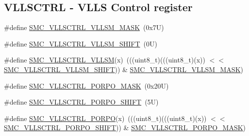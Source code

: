 \subsection*{V\+L\+L\+S\+C\+T\+RL -\/ V\+L\+LS Control register}
\begin{DoxyCompactItemize}
\item 
\#define \mbox{\hyperlink{group___s_m_c___register___masks_ga4f4e91c4841316ab1eae1a74c0091ff4}{S\+M\+C\+\_\+\+V\+L\+L\+S\+C\+T\+R\+L\+\_\+\+V\+L\+L\+S\+M\+\_\+\+M\+A\+SK}}~(0x7\+U)
\item 
\#define \mbox{\hyperlink{group___s_m_c___register___masks_ga67af6c7ed0835ed408cf511e8b9c9b13}{S\+M\+C\+\_\+\+V\+L\+L\+S\+C\+T\+R\+L\+\_\+\+V\+L\+L\+S\+M\+\_\+\+S\+H\+I\+FT}}~(0\+U)
\item 
\#define \mbox{\hyperlink{group___s_m_c___register___masks_ga1358fb0c1720e22d38d6fccaf0cdfd34}{S\+M\+C\+\_\+\+V\+L\+L\+S\+C\+T\+R\+L\+\_\+\+V\+L\+L\+SM}}(x)~(((uint8\+\_\+t)(((uint8\+\_\+t)(x)) $<$$<$ \mbox{\hyperlink{group___s_m_c___register___masks_ga67af6c7ed0835ed408cf511e8b9c9b13}{S\+M\+C\+\_\+\+V\+L\+L\+S\+C\+T\+R\+L\+\_\+\+V\+L\+L\+S\+M\+\_\+\+S\+H\+I\+FT}})) \& \mbox{\hyperlink{group___s_m_c___register___masks_ga4f4e91c4841316ab1eae1a74c0091ff4}{S\+M\+C\+\_\+\+V\+L\+L\+S\+C\+T\+R\+L\+\_\+\+V\+L\+L\+S\+M\+\_\+\+M\+A\+SK}})
\item 
\#define \mbox{\hyperlink{group___s_m_c___register___masks_ga44691ea357e857b84a0f2f6db808ae0d}{S\+M\+C\+\_\+\+V\+L\+L\+S\+C\+T\+R\+L\+\_\+\+P\+O\+R\+P\+O\+\_\+\+M\+A\+SK}}~(0x20\+U)
\item 
\#define \mbox{\hyperlink{group___s_m_c___register___masks_ga255471752ad43100216590dba76a5a0e}{S\+M\+C\+\_\+\+V\+L\+L\+S\+C\+T\+R\+L\+\_\+\+P\+O\+R\+P\+O\+\_\+\+S\+H\+I\+FT}}~(5\+U)
\item 
\#define \mbox{\hyperlink{group___s_m_c___register___masks_gac1c647d95ea0c871b5d3eba1f8a01316}{S\+M\+C\+\_\+\+V\+L\+L\+S\+C\+T\+R\+L\+\_\+\+P\+O\+R\+PO}}(x)~(((uint8\+\_\+t)(((uint8\+\_\+t)(x)) $<$$<$ \mbox{\hyperlink{group___s_m_c___register___masks_ga255471752ad43100216590dba76a5a0e}{S\+M\+C\+\_\+\+V\+L\+L\+S\+C\+T\+R\+L\+\_\+\+P\+O\+R\+P\+O\+\_\+\+S\+H\+I\+FT}})) \& \mbox{\hyperlink{group___s_m_c___register___masks_ga44691ea357e857b84a0f2f6db808ae0d}{S\+M\+C\+\_\+\+V\+L\+L\+S\+C\+T\+R\+L\+\_\+\+P\+O\+R\+P\+O\+\_\+\+M\+A\+SK}})
\end{DoxyCompactItemize}
